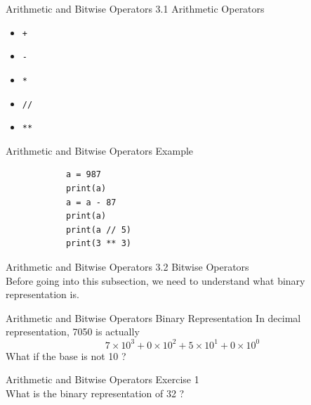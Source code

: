 \documentclass{beamer}
\begin{document}
    \begin{frame}{Arithmetic and Bitwise Operators}
        \color{blue} \Large 3.1 Arithmetic Operators \\
        
        \color{black} \normalsize \vskip 10pt 
        \begin{itemize}
            \item \texttt{+}
            \item \texttt{-}
            \item \texttt{*}
            \item \texttt{//}
            \item \texttt{**}
        \end{itemize}
    \end{frame}

    \begin{frame}[fragile]{Arithmetic and Bitwise Operators}
        \color{blue} \Large Example \\
        \color{black} \normalsize \vskip 10pt 
        \begin{verbatim}
            a = 987
            print(a)
            a = a - 87
            print(a)
            print(a // 5)
            print(3 ** 3)
        \end{verbatim}
        
    \end{frame}
    
    \begin{frame}{Arithmetic and Bitwise Operators}
        \color{blue} \Large 3.2 Bitwise Operators \\
        
        \color{black} \normalsize \vskip 10pt 
        Before going into this subsection, we need to understand what binary 
        representation is.
    
    \end{frame}
    
    \begin{frame}{Arithmetic and Bitwise Operators}
        \color{blue} \Large Binary Representation
        \color{black} \normalsize \vskip 10pt
        In decimal representation, 7050 is actually
        \[ 7 \times 10^3 + 0 \times 10^2 + 5 \times 10^1 + 0 \times 10^0 \]
        \vskip 30pt
        What if the base is not 10 ?
    \end{frame}
    
    \begin{frame}{Arithmetic and Bitwise Operators}
        \color{blue} \Large Exercise 1 \\
        \color{black} \normalsize \vskip 10pt
        What is the binary representation of 32 ?
    \end{frame}
\end{document}
